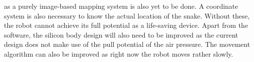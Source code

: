 \documentclass[twoside, 11pt]{article}
\begin{document}
as a purely image-based mapping system is also yet to be done. A coordinate system is also necessary to know the actual location of the snake. Without these, the robot cannot achieve its full potential as a life-saving device. Apart from the software, the silicon body design will also need to be improved as the current design does not make use of the pull potential of the air pressure. The movement algorithm can also be improved as right now the robot moves rather slowly.





\newpage	
\printbibliography

\end{document}
